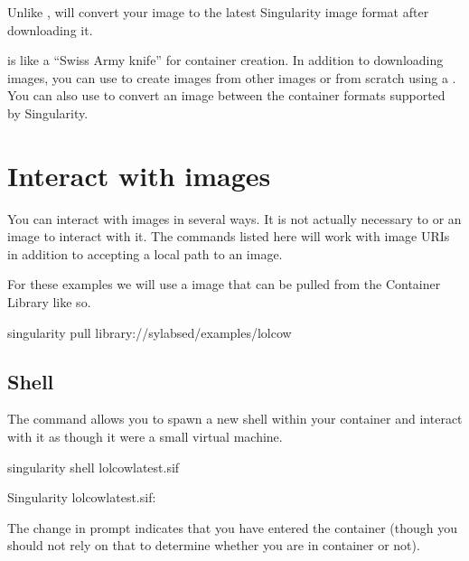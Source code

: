 \documentclass[letterpaper,10pt,english]{sphinxmanual}
\begin{document}
Unlike ,  will convert your image to the latest Singularity
image format after downloading it.

 is like a “Swiss Army knife” for container creation. In addition to
downloading images, you can use  to create images from other images or
from scratch using a . You can also
use  to convert an image between the container formats supported by
Singularity.


\section{Interact with images}
\label{\detokenize{quick_start:interact-with-images}}
You can interact with images in several ways. It is not actually necessary to
 or  an image to interact with it. The commands listed here
will work with image URIs in addition to accepting a local  path to an image.

For these examples we will use a  image that can be pulled
from the Container Library like so.

%
\begin{sphinxVerbatim}[commandchars=\\\{\}]
\PYGZdl{} singularity pull library://sylabsed/examples/lolcow
\end{sphinxVerbatim}


\subsection{Shell}
\label{\detokenize{quick_start:shell}}
The  command allows you to spawn a new shell within
your container and interact with it as though it were a small virtual machine.

%
\begin{sphinxVerbatim}[commandchars=\\\{\}]
\PYGZdl{} singularity shell lolcow\PYGZus{}latest.sif

Singularity lolcow\PYGZus{}latest.sif:\PYGZti{}\PYGZgt{}
\end{sphinxVerbatim}

The change in prompt indicates that you have entered the container (though you
should not rely on that to determine whether you are in container or not).
\end{document}
